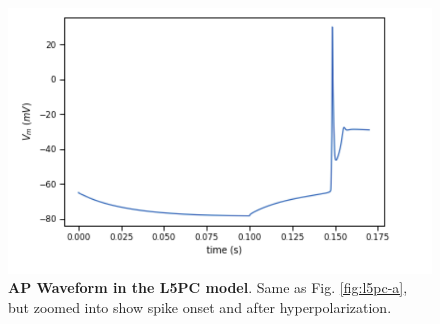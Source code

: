 \begin{figure}
 \begin{center}
\includegraphics[scale=0.8]{figures/spike_shape.png}
\caption[AP Waveform in the L5PC model (B)]{\textbf{AP Waveform in the L5PC model}.
Same as Fig. \ref{fig:l5pc-a}, but zoomed into show spike onset and after hyperpolarization.}
\label{fig:l5pc-b}
\end{center}
\end{figure}


